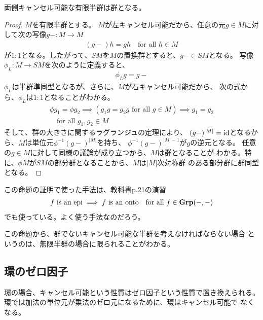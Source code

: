 	\begin{proposition}[キャンセル可能な有限半群]
	\label{prop:キャンセル可能な有限半群} %
		両側キャンセル可能な有限半群は群となる。
	\end{proposition} %
	\begin{proof} $M$を有限半群とする。
	$M$が左キャンセル可能だから、任意の元$g\in M$に対して次の写像$g-:M\to M$
	\begin{equation*}\begin{split}
		(g-)h = gh \quad\text{for all }h\in M
	\end{split}\end{equation*}
	が$1:1$となる。したがって、$SM$を$M$の置換群とすると、$g-\in SM$となる。
	写像$\phi_L:M\to SM$を次のように定義すると、
	\begin{equation*}\begin{split}
		\phi_Lg = g-
	\end{split}\end{equation*}
	$\phi_L$は半群準同型となるが、さらに、$M$が右キャンセル可能だから、
	次の式から、$\phi_L$は$1:1$となることがわかる。
	\begin{equation*}\begin{split}
		\phi g_1 = \phi g_2
		\implies (g_1g = g_2g \text{ for all }g\in M)
		\implies g_1 = g_2 \\
		\quad\text{for all }g_1,g_2\in M
	\end{split}\end{equation*}
	そして、群の大きさに関するラグランジュの定理により、
	$(g-)^{|M|}={\operatorname{id}}$となるから、$M$は単位元$\phi^{-1}(g-)^{|M|}$を持ち、
	$\phi^{-1}(g-)^{|M|-1}$が$g$の逆元となる。
	任意の$g\in M$に対して同様の議論が成り立つから、$M$は群となることが
	わかる。特に、$\phi M$が$SM$の部分群となることから、$M$は$|M|$次対称群
	のある部分群に群同型となる。
	\end{proof}

	この命題の証明で使った手法は、教科書\cite{maclane.work}\;p.21の演習
	\begin{equation*}\begin{split}
		\text{$f$ is an ${\operatorname{epi}}$} \implies \text{$f$ is an ${\operatorname{onto}}$}
		\quad\text{for all }f\in {\ensuremath{\mathbf{Grp}}}(-,-)
	\end{split}\end{equation*}
	でも使っている。よく使う手法なのだろう。
	
	この命題から、群でないキャンセル可能な半群を考えなければならない場合
	というのは、無限半群の場合に限られることがわかる。
\subsection{環のゼロ因子}\label{s2:環のゼロ因子} %
	環の場合、キャンセル可能という性質はゼロ因子という性質で置き換えられる。
	環では加法の単位元が乗法のゼロ元になるために、環はキャンセル可能で
	なくなる。

